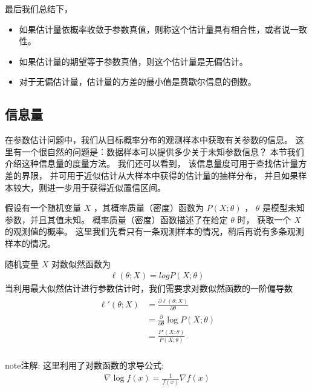 \documentclass[letterpaper,10pt,english]{sphinxmanual}
\begin{document}
最后我们总结下，
\begin{itemize}
\item {} 
如果估计量依概率收敛于参数真值，则称这个估计量具有相合性，或者说一致性。

\item {} 
如果估计量的期望等于参数真值，则这个估计量是无偏估计。

\item {} 
对于无偏估计量，估计量的方差的最小值是费歇尔信息的倒数。

\end{itemize}


\subsection{信息量}
\label{\detokenize{_u63a8_u65ad_u4e0e_u68c0_u9a8c/content:ch-2-fisher-information}}\label{\detokenize{_u63a8_u65ad_u4e0e_u68c0_u9a8c/content:id14}}
在参数估计问题中，我们从目标概率分布的观测样本中获取有关参数的信息。
这里有一个很自然的问题是：数据样本可以提供多少关于未知参数信息？
本节我们介绍这种信息量的度量方法。
我们还可以看到，
该信息量度可用于查找估计量方差的界限，
并可用于近似估计从大样本中获得的估计量的抽样分布，
并且如果样本较大，则进一步用于获得近似置信区间。

假设有一个随机变量 \(X\)
，其概率质量（密度）函数为 \(P(X;\theta)\)
， \(\theta\) 是模型未知参数，并且其值未知。
概率质量（密度）函数描述了在给定 \(\theta\) 时，
获取一个 \(X\) 的观测值的概率。
这里我们先看只有一条观测样本的情况，稍后再说有多条观测样本的情况。

随机变量 \(X\)   对数似然函数为
\begin{equation}\label{equation:推断与检验/content:推断与检验/content:53}
\begin{split}\ell(\theta;X) = log P(X;\theta)\end{split}
\end{equation}
当利用最大似然估计进行参数估计时，我们需要求对数似然函数的一阶偏导数
\begin{align}\label{equation:推断与检验/content:推断与检验/content:54}\!\begin{aligned}
\ell'(\theta;X) &= \frac{\partial  \ell(\theta;X) }{\partial \theta}\\
&=  \frac{\partial }{\partial \theta} \log P(X;\theta)\\
&=\frac{P'(X;\theta)}{P(X;\theta)}\\
\end{aligned}\end{align}
\begin{sphinxadmonition}{note}{注解:}
这里利用了对数函数的求导公式:
\begin{equation}\label{equation:推断与检验/content:推断与检验/content:55}
\begin{split}\nabla \log f(x) = \frac{1}{f(x)} \nabla f(x)\end{split}
\end{equation}\end{sphinxadmonition}
\end{document}

